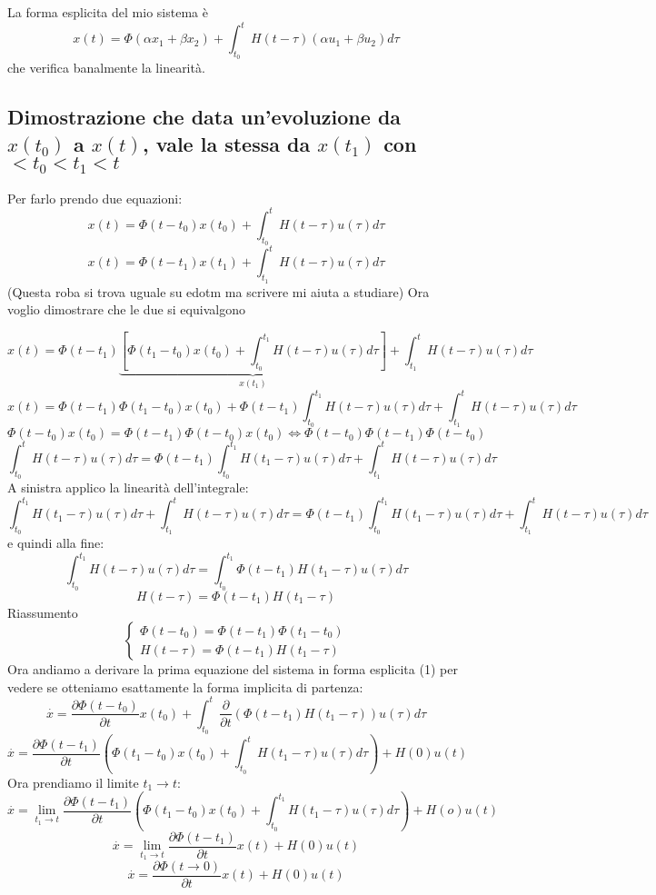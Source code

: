\documentclass{article}
\begin{document}
La forma esplicita del mio sistema è 
\[
x(t) = \Phi(\alpha x_1+\beta x_2) + \int_{t_0}^{t} H(t-\tau)(\alpha u_1 +\beta u_2)d\tau    
\]
che verifica banalmente la linearità.


\subsection{\boldmath Dimostrazione che data un'evoluzione da $x(t_0)$ a $x(t)$, vale la stessa da $x(t_1)$ con $<t_0<t_1<t$}
Per farlo prendo due equazioni:
\begin{equation}
    x(t) = \Phi(t-t_0)x(t_0)+\int_{t_0}^{t} H(t-\tau)u(\tau)d\tau
\end{equation}
\begin{equation}
    x(t) = \Phi(t-t_1)x(t_1)+\int_{t_1}^{t} H(t-\tau)u(\tau)d\tau
\end{equation}
(Questa roba si trova uguale su edotm ma scrivere mi aiuta a studiare)
Ora voglio dimostrare che le due si equivalgono

\[ x(t) = \Phi(t-t_1)\underbrace{\left[ \Phi(t_1-t_0)x(t_0)+\int_{t_0}^{t_1} H(t-\tau)u(\tau)d\tau\right]}_{x(t_1)}+\int_{t_1}^{t} H(t-\tau)u(\tau)d\tau \]
\[x(t) = \Phi(t-t_1)\Phi(t_1-t_0)x(t_0)+\Phi(t-t_1)\int_{t_0}^{t_1} H(t-\tau)u(\tau)d\tau+\int_{t_1}^{t} H(t-\tau)u(\tau)d\tau\]
\[ \Phi(t-t_0)x(t_0)= \Phi(t-t_1)\Phi(t-t_0)x(t_0)\Longleftrightarrow\Phi(t-t_0)\Phi(t-t_1)\Phi(t-t_0) \]
\[ \int_{t_0}^{t} H(t-\tau)u(\tau)d\tau = \Phi(t-t_1)\int_{t_0}^{t_1} H(t_1-\tau)u(\tau)d\tau+\int_{t_1}^{t} H(t-\tau)u(\tau)d\tau \] 
A sinistra applico la linearità dell'integrale:
\[ \int_{t_0}^{t_1} H(t_1-\tau)u(\tau)d\tau+\int_{t_1}^{t} H(t-\tau)u(\tau)d\tau
 = \Phi(t-t_1)\int_{t_0}^{t_1} H(t_1-\tau)u(\tau)d\tau+\int_{t_1}^{t} H(t-\tau)u(\tau)d\tau \]
e quindi alla fine:
\[ \int_{t_0}^{t_1} H(t-\tau)u(\tau)d\tau = \int_{t_0}^{t_1}\Phi(t-t_1) H(t_1-\tau)u(\tau)d\tau \]
\[ H(t-\tau) = \Phi(t-t_1) H(t_1-\tau) \]
Riassumento
\[\begin{cases} 
        \Phi(t-t_0) = \Phi(t-t_1)\Phi(t_1-t_0)\\
        H(t-\tau) = \Phi(t-t_1) H(t_1-\tau)
\end{cases}
\]
Ora andiamo a derivare la prima equazione del sistema in forma esplicita (1) per vedere se otteniamo
esattamente la forma implicita di partenza:
\[ \overset{\cdot}{x} = \frac{\partial \Phi(t-t_0)}{\partial t}x(t_0)+\int_{t_0}^{t} \frac{\partial}{\partial t}\left( \Phi(t-t_1) H(t_1-\tau)\right)u(\tau)d\tau \]
\[ \overset{\cdot}{x} = \frac{\partial \Phi(t-t_1)}{\partial t}\left(\Phi(t_1-t_0)x(t_0)+\int_{t_0}^{t}H(t_1-\tau)u(\tau)d\tau\right)+H(0)u(t) \]
Ora prendiamo il limite $t_1\to t$:
\[ \overset{\cdot}{x} = \lim_{t_1\to t}\frac{\partial \Phi(t-t_1)}{\partial t}\left(\Phi(t_1-t_0)x(t_0)+\int_{t_0}^{t_1}H(t_1-\tau)u(\tau)d\tau\right)+H(o)u(t) \]
\[ \overset{\cdot}{x} = \lim_{t_1\to t}\frac{\partial \Phi(t-t_1)}{\partial t}x(t)+H(0)u(t) \]
\[ \overset{\cdot}{x} = \frac{\partial \Phi(t\to0)}{\partial t}x(t)+H(0)u(t) \]
\end{document}
